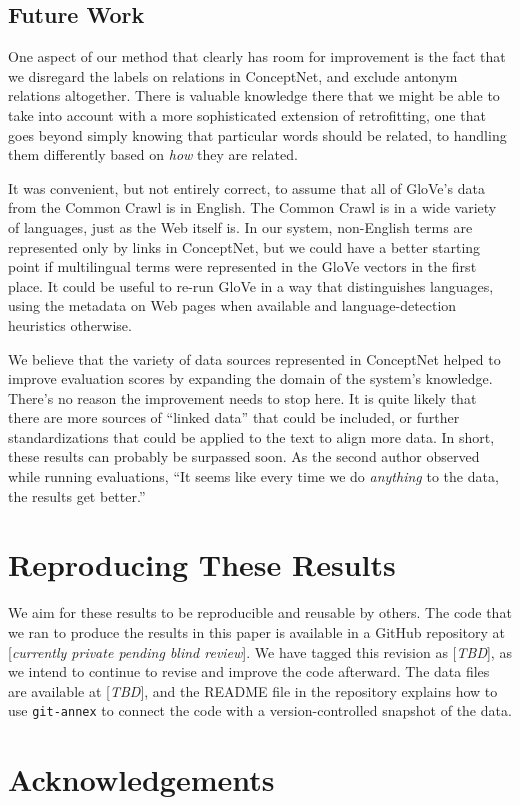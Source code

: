 \documentclass[11pt,letterpaper]{article}
\begin{document}
\subsection{Future Work}


One aspect of our method that clearly has room for improvement is the fact that
we disregard the labels on relations in ConceptNet, and exclude antonym
relations altogether. There is valuable knowledge there that we might be able
to take into account with a more sophisticated extension of retrofitting, one
that goes beyond simply knowing that particular words should be related, to
handling them differently based on {\em how} they are related.

It was convenient, but not entirely correct, to assume that all of GloVe's data
from the Common Crawl is in English. The Common Crawl is in a wide variety of
languages, just as the Web itself is. In our system, non-English terms are
represented only by links in ConceptNet, but we could have a better starting
point if multilingual terms were represented in the GloVe vectors in the first
place. It could be useful to re-run GloVe in a way that distinguishes languages,
using the metadata on Web pages when available and language-detection heuristics
otherwise.

We believe that the variety of data sources represented in ConceptNet helped to
improve evaluation scores by expanding the domain of the system's knowledge.
There's no reason the improvement needs to stop here. It is quite likely that
there are more sources of ``linked data'' that could be included, or further
standardizations that could be applied to the text to align more data. In
short, these results can probably be surpassed soon. As the second author
observed while running evaluations, ``It seems like every time we do {\em
anything} to the data, the results get better.''

\section{Reproducing These Results}

We aim for these results to be reproducible and reusable by others. The code
that we ran to produce the results in this paper is available in a GitHub
repository at [{\em currently private pending blind review}]. We have tagged
this revision as [{\em TBD}], as we intend to continue to revise and improve the
code afterward. The data files are available at [{\em TBD}], and the README file
in the repository explains how to use {\tt git-annex} to connect the code
with a version-controlled snapshot of the data.

\section*{Acknowledgements}

\begin{CJK*}{UTF8}{min}

\end{CJK*}
\end{document}
